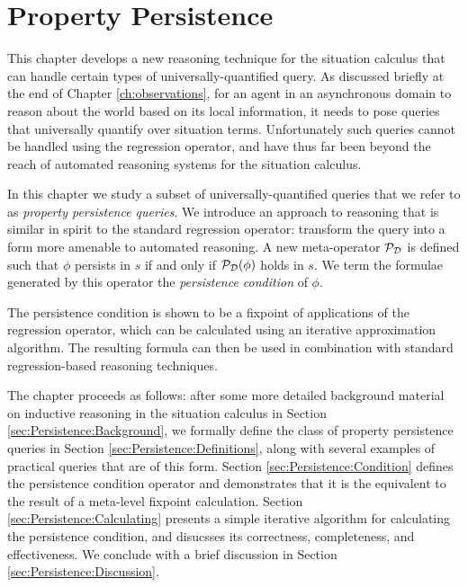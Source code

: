 

\chapter{Property Persistence}

\label{ch:persistence}

This chapter develops a new reasoning technique for the situation
calculus that can handle certain types of universally-quantified query.
As discussed briefly at the end of Chapter \ref{ch:observations},
for an agent in an asynchronous domain to reason about the world based
on its local information, it needs to pose queries that universally
quantify over situation terms. Unfortunately such queries cannot be
handled using the regression operator, and have thus far been beyond
the reach of automated reasoning systems for the situation calculus.

In this chapter we study a subset of universally-quantified queries
that we refer to as \emph{property persistence queries}. We introduce
an approach to reasoning that is similar in spirit to the standard
regression operator: transform the query into a form more amenable
to automated reasoning. A new meta-operator $\mathcal{P}_{\mathcal{D}}$ is defined
such that $\phi$ persists in $s$ if and only if $\mathcal{P}_{\mathcal{D}}(\phi)$
holds in $s$. We term the formulae generated by this operator the
\emph{persistence condition} of $\phi$.

The persistence condition is shown to be a fixpoint of applications
of the regression operator, which can be calculated using an iterative
approximation algorithm. The resulting formula can then be used in
combination with standard regression-based reasoning techniques.

The chapter proceeds as follows: after some more detailed background
material on inductive reasoning in the situation calculus in Section
\ref{sec:Persistence:Background}, we formally define the class of
property persistence queries in Section \ref{sec:Persistence:Definitions},
along with several examples of practical queries that are of this
form. Section \ref{sec:Persistence:Condition} defines the persistence
condition operator and demonstrates that it is the equivalent to the
result of a meta-level fixpoint calculation. Section \ref{sec:Persistence:Calculating}
presents a simple iterative algorithm for calculating the persistence
condition, and disucsses its correctness, completeness, and effectiveness.
We conclude with a brief discussion in Section \ref{sec:Persistence:Discussion}.


